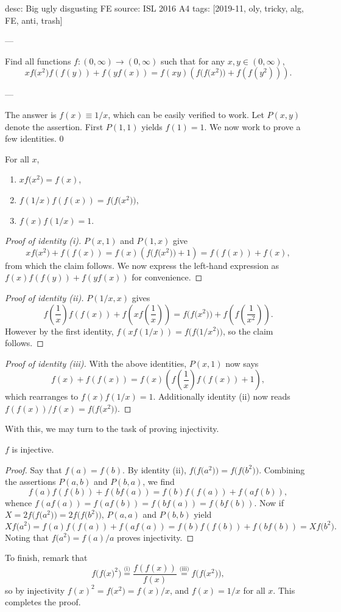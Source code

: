 desc: Big ugly disgusting FE
source: ISL 2016 A4
tags: [2019-11, oly, tricky, alg, FE, anti, trash]

---

Find all functions $f:(0,\infty)\to(0,\infty)$ such that for any $x,y\in(0,\infty)$, \[xf\big(x^2\big)f(f(y))+f(yf(x))=f(xy)\left(f\big(f\big(x^2\big)\big)+f(f(y^2))\right).\]

---

The answer is $f(x)\equiv1/x$, which can be easily verified to work. Let $P(x,y)$ denote the assertion. First $P(1,1)$ yields $f(1)=1$. We now work to prove a few identities.
\setcounter{claim}0
\begin{claim}
    For all $x$,
    \begin{enumerate}[label=(\roman*),itemsep=0em]
        \item $xf\big(x^2\big)=f(x)$,
        \item $f(1/x)f(f(x))=f\big(f\big(x^2\big)\big)$,
        \item $f(x)f(1/x)=1$.
    \end{enumerate}
\end{claim}
\begin{proof}[Proof of identity \emph{(i)}]
    $P(x,1)$ and $P(1,x)$ give \[xf\big(x^2\big)+f(f(x))=f(x)\left(f\big(f\big(x^2\big)\big)+1\right)=f(f(x))+f(x),\]
    from which the claim follows. We now express the left-hand expression as $f(x)f(f(y))+f(yf(x))$ for convenience.
\end{proof}
\begin{proof}[Proof of identity \emph{(ii)}]
    $P(1/x,x)$ gives \[f\left(\frac1x\right)f(f(x))+f\left(xf\left(\frac1x\right)\right)=f\big(f\big(x^2\big)\big)+f\left(f\left(\frac1{x^2}\right)\right).\]
    However by the first identity, $f(xf(1/x))=f\big(f\big(1/x^2\big)\big)$, so the claim follows.
\end{proof}
\begin{proof}[Proof of identity \emph{(iii)}]
    With the above identities, $P(x,1)$ now says \[f(x)+f(f(x))=f(x)\left(f\left(\frac1x\right)f(f(x))+1\right),\]
    which rearranges to $f(x)f(1/x)=1$. Additionally identity (ii) now reads $f(f(x))/f(x)=f\big(f\big(x^2\big)\big)$.
\end{proof}

With this, we may turn to the task of proving injectivity.
\begin{claim}
    $f$ is injective.
\end{claim}
\begin{proof}
    Say that $f(a)=f(b)$. By identity (ii), $f\big(f\big(a^2\big)\big)=f\big(f\big(b^2\big)\big)$. Combining the assertions $P(a,b)$ and $P(b,a)$, we find \[f(a)f(f(b))+f(bf(a))=f(b)f(f(a))+f(af(b)),\]
    whence $f(af(a))=f(af(b))=f(bf(a))=f(bf(b))$. Now if $X=2f\big(f\big(a^2\big)\big)=2f\big(f\big(b^2\big)\big)$, $P(a,a)$ and $P(b,b)$ yield \[Xf\big(a^2\big)=f(a)f(f(a))+f(af(a))=f(b)f(f(b))+f(bf(b))=Xf\big(b^2\big).\]
    Noting that $f\big(a^2\big)=f(a)/a$ proves injectivity.
\end{proof}

To finish, remark that \[f\big(f\big(x\big)^2\big)\stackrel{\text{(i)}}=\frac{f(f(x))}{f(x)}\stackrel{\text{(iii)}}=f\big(f\big(x^2\big)\big),\]
so by injectivity $f(x)^2=f\big(x^2\big)=f(x)/x$, and $f(x)=1/x$ for all $x$. This completes the proof.
